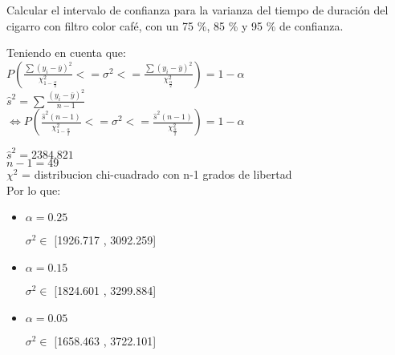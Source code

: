 Calcular el intervalo de confianza para la varianza del tiempo de duraci\'on del cigarro con filtro color
caf\'e, con un 75 \%, 85 \% y 95 \% de confianza.

Teniendo en cuenta que: \\

$P(\frac{\sum(y_i - \overline{y})^2}{\chi_{1-{\frac{\alpha}{2}}}^2} <= \sigma^2 <= \frac{\sum(y_i - \overline{y})^2}{\chi_{\frac{\alpha}{2}}^2}) = 1 - \alpha$\\

$\widehat{s}^2 = \sum \frac{(y_i - \overline{y})^2}{n-1}$\\

$\Leftrightarrow P(\frac{\widehat{s}^2 (n-1)}{\chi_{1-{\frac{\alpha}{2}}}^2} <= \sigma^2 <= \frac{\widehat{s}^2 (n-1)}{\chi_{\frac{\alpha}{2}}^2}) = 1 - \alpha$

$\widehat{s}^2 = 2384.821$\\
$n - 1 = 49$\\
$\chi^2$ = distribucion chi-cuadrado con n-1 grados de libertad\\

Por lo que: \\

\begin{itemize}

\item $\alpha = 0.25$

$\sigma^2 \in$ [1926.717 , 3092.259]

\item $\alpha = 0.15$

$\sigma^2 \in$ [1824.601 , 3299.884]

\item $\alpha = 0.05$

$\sigma^2 \in$ [1658.463 , 3722.101]

\end{itemize}
